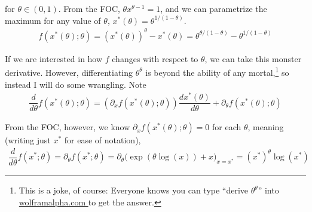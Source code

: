\documentclass{article}
\begin{document}
for $\theta \in (0, 1)$. From the FOC, $\theta x^{\theta - 1} = 1$, and we can parametrize the maximum for any value of $\theta$, $x^*(\theta) = \theta^{1/(1 - \theta)}$.
\begin{align*}
  f(x^*(\theta); \theta)
  =
  (x^*(\theta))^\theta - x^*(\theta)
  =
  \theta^{\theta /(1 - \theta)}
  -
  \theta^{1 /(1 - \theta)}
\end{align*}

If we are interested in how $f$ changes with respect to $\theta$, we can take this monster derivative. However, differentiating $\theta^\theta$ is beyond the ability of any mortal,\footnote{This is a joke, of course: Everyone knows you can type ``derive $\theta^\theta$'' into \href{https://www.wolframalpha.com/}{wolframalpha.com \ExternalLink} to get the answer.} so instead I will do some wrangling. Note
\begin{align*}
  \dfrac{d}{d\theta}
  f(x^*(\theta); \theta)
  =
  \left(
    \partial_x f(x^*(\theta); \theta)
  \right) \dfrac{d x^*(\theta)}{d \theta}
  +
  \partial_{\theta} f(x^*(\theta); \theta)
\end{align*}

From the FOC, however, we know $\partial_x f(x^*(\theta); \theta) = 0$ for each $\theta$, meaning (writing just $x^*$ for ease of notation),
\begin{align*}
  \dfrac{d}{d\theta} f(x^*; \theta)
  =
  \partial_{\theta} f(x^*; \theta)
  =
  \partial_{\theta}
  \Big(
    \exp(\theta \log(x))
    +
    x
  \Big)_{x = x^*}
  =
  (x^*)^\theta \log(x^*)
\end{align*}
\end{document}
